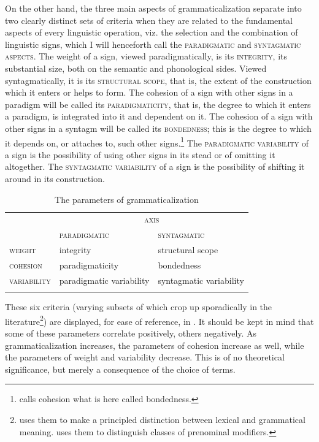 On the other hand, the three main aspects of grammaticalization separate into two clearly distinct sets of criteria when they are related to the fundamental aspects of every linguistic operation, viz. the selection and the combination of linguistic signs, which I will henceforth call the \textsc{paradigmatic} and \textsc{syntagmatic aspects}. The weight of a sign, viewed paradigmatically, is its \textsc{integrity}, its substantial size, both on the semantic and phonological sides. Viewed syntagmatically, it is its \textsc{structural scope}, that is, the extent of the construction which it enters or helps to form. The cohesion of a sign with other signs in a paradigm will be called its \textsc{paradigmaticity}, that is, the degree to which it enters a paradigm, is integrated into it and dependent on it. The cohesion of a sign with other signs in a syntagm will be called its \textsc{bondedness}; this is the degree to which it depends on, or attaches to, such other signs.\footnote{\citet[8]{Bazell1949} calls cohesion what is here called bondedness.} The \textsc{paradigmatic variability} of a sign is the possibility of using other signs in its stead or of omitting it altogether. The \textsc{syntagmatic variability} of a sign is the possibility of shifting it around in its construction.

\begin{table}
\begin{tabular}{lll}
\lsptoprule
 \multirow{2}{*}{\scshape paramater} & \multicolumn{2}{c}{\scshape axis}\\ \cmidrule{2-3}
 
& \scshape paradigmatic & \scshape syntagmatic\\
\midrule
\scshape weight & integrity & structural scope\\
\scshape cohesion & paradigmaticity & bondedness\\
\scshape variability & paradigmatic variability & syntagmatic variability\\
\lspbottomrule
\end{tabular}
\caption{The parameters of grammaticalization}\label{T4}
\end{table}

These six criteria (varying subsets of which crop up sporadically in the literature\footnote{\citet[169]{Weinreich1963} uses them to make a principled distinction between lexical and grammatical meaning. \citet[Ch. I]{VanRoey1974} uses them to distinguish classes of prenominal modifiers.}) are displayed, for ease of reference, in . It should be kept in mind that some of these parameters correlate positively, others negatively. As grammaticalization increases, the parameters of cohesion increase as well, while the parameters of weight and variability decrease. This is of no theoretical significance, but merely a consequence of the choice of terms.

